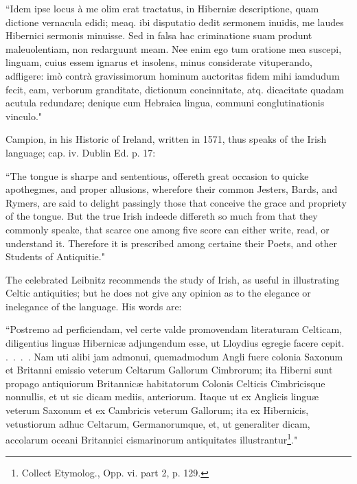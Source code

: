 \documentclass[11pt,oneside]{memoir}
\begin{document}
``Idem ipse locus à me olim erat tractatus, in Hiberniæ descriptione, quam dictione vernacula edidi; meaq. ibi disputatio dedit sermonem inuidis, me laudes Hibernici sermonis minuisse.
Sed in falsa hac criminatione suam produnt maleuolentiam, non redarguunt meam.
Nee enim ego tum oratione mea suscepi, linguam, cuius essem ignarus et insolens, minus considerate vituperando, adfligere: imò contrà gravissimorum hominum auctoritas fidem mihi iamdudum fecit, eam, verborum granditate, dictionum concinnitate, atq. dicacitate quadam acutula redundare; denique cum Hebraica lingua, communi conglutinationis vinculo."

Campion, in his Historic of Ireland, written in 1571, thus speaks of the Irish language; cap. iv. Dublin Ed. p. 17: 


``The tongue is sharpe and sententious, offereth great occasion to quicke apothegmes, and proper allusions, wherefore their common Jesters, Bards, and Rymers, are said to delight passingly those that conceive the grace and propriety of the tongue.
But the true Irish indeede differeth so much from that they commonly speake, that scarce one among five score can either write, read, or understand it.
Therefore it is prescribed among certaine their Poets, and other Students of 
Antiquitie."

The celebrated Leibnitz recommends the study of Irish, as useful in illustrating Celtic antiquities; but he does not give any opinion as to the elegance or inelegance of the language.
His words are: 

``Postremo ad perficiendam, vel certe valde promovendam literaturam Celticam, diligentius linguæ Hibernicæ adjungendum esse, ut Lloydius egregie facere cepit. .~.~.~.
Nam uti alibi jam admonui, quemadmodum Angli fuere colonia Saxonum et Britanni emissio veterum Celtarum Gallorum Cimbrorum; ita Hiberni sunt propago antiquiorum Britannicæ habitatorum Colonis Celticis Cimbricisque nonnullis, et ut sic dicam mediis, anteriorum.
Itaque ut ex Anglicis linguæ veterum Saxonum et ex Cambricis veterum Gallorum; ita ex Hibernicis, vetustiorum adhuc Celtarum, Germanorumque, et, ut generaliter dicam, accolarum oceani Britannici cismarinorum antiquitates illustrantur\footnote{
    Collect Etymolog., Opp. vi. part 2, p. 129.
}."
\end{document}
